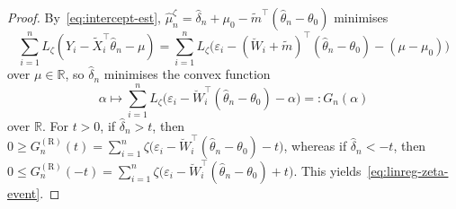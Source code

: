 \documentclass[a4paper]{article}
\newcommand{\R}{\mathbb{R}}
\theoremstyle{definition}
\begin{document}
\begin{proof}
By~\eqref{eq:intercept-est}, $\hat{\mu}_n^\zeta = \hat{\delta}_n + \mu_0 - \tilde{m}^\top(\hat{\theta}_n - \theta_0)$ minimises
\[
\sum_{i=1}^n L_\zeta(Y_i - \tilde{X}_i^\top\hat{\theta}_n - \mu) = \sum_{i=1}^n L_\zeta\bigl(\varepsilon_i - (\breve{W}_i + \tilde{m})^\top(\hat{\theta}_n - \theta_0) - (\mu - \mu_0)\bigr)
\]
over $\mu \in \R$, so $\hat{\delta}_n$ minimises the convex function 
\begin{equation}
\label{eq:Gn-alpha}
\alpha \mapsto \sum_{i=1}^n L_\zeta\bigl(\varepsilon_i - \breve{W}_i^\top(\hat{\theta}_n - \theta_0) - \alpha\bigr) =: G_n(\alpha)
\end{equation}
over $\R$. For $t > 0$, if $\hat{\delta}_n > t$, then $0 \geq G_n^{(\mathrm{R})}(t) = \sum_{i=1}^n \zeta\bigl(\varepsilon_i - \breve{W}_i^\top(\hat{\theta}_n - \theta_0) - t\bigr)$, whereas if $\hat{\delta}_n < -t$, then $0 \leq G_n^{(\mathrm{R})}(-t) = \sum_{i=1}^n \zeta\bigl(\varepsilon_i - \breve{W}_i^\top(\hat{\theta}_n - \theta_0) + t\bigr)$. This yields~\eqref{eq:linreg-zeta-event}.


\end{proof}
\end{document}
